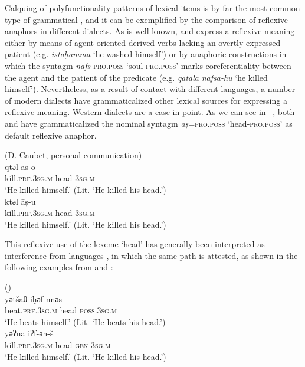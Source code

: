 \documentclass[output=paper]{langsci/langscibook}
\begin{document}
Calquing of polyfunctionality patterns of lexical items is by far the most common type of grammatical , and it can be exemplified by the comparison of reflexive anaphors in different  dialects. As is well known,  and   express a reflexive meaning either by means of agent-oriented derived verbs lacking an overtly expressed patient (e.g. \textit{istaḥamma} ‘he washed himself’) or by anaphoric constructions in which the syntagm \textit{nafs-}\textsc{pro.poss} ‘soul-\textsc{pro.poss’} marks coreferentiality between the agent and the patient of the predicate (e.g. \textit{qatala} \textit{nafsa-hu} ‘he killed himself’). Nevertheless, as a result of contact with different languages, a number of modern  dialects have grammaticalized other lexical sources for expressing a reflexive meaning. Western  dialects are a case in point. As we can see in --, both  and   have grammaticalized the nominal syntagm \textit{{\R}āṣ=}\textsc{pro.poss} ‘head-\textsc{pro.poss’} as default reflexive anaphor.

\ea\label{15}
{  (D. Caubet, personal communication)} \\
\gll   qtәl {\R}ās-o\\
       kill.\textsc{prf.3sg.m} head-\textsc{3sg.m}\\
\glt   `He killed himself.' (Lit. ‘He killed his head.’)
\ex \label{16}
{  \citep[16]{Taine-Cheikh2008chapter}}\\
\gll   ktәl {\R}āṣ-u\\
       kill.\textsc{prf.3sg.m} head-\textsc{3sg.m}\\
\glt   `He killed himself.' (Lit. ‘He killed his head.’)
\z

This reflexive use of the lexeme ‘head’ has generally been interpreted as  interference from  languages \citep[197]{ElAissati2011}, in which the same  path is attested, as shown in the following examples from  and : 

\ea
{  (\citealt[95]{Kossmann2000})}\\
\gll   yәtšaθ iḫәf nnәs\\
       beat.\textsc{prf.3sg.m} head \textsc{poss.3sg.m}\\
\glt   `He beats himself.' (Lit. ‘He beats his head.’)
\ex
{  \citep[126]{Taine-Cheikh2008chapter}}\\
\gll   yәʔna iʔf-әn-š\\
       kill.\textsc{prf.3sg.m} head-\textsc{gen-3sg.m}\\
\glt   `He killed himself.' (Lit. ‘He killed his head.’)
\z
\end{document}
